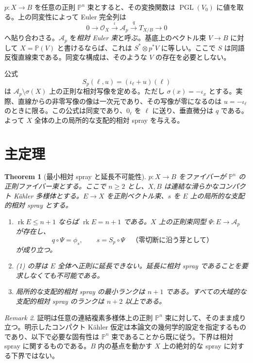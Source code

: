 \documentclass[12pt]{amsart}
\newtheorem{thm}{Theorem}[section]
\theoremstyle{definition}
\theoremstyle{remark}
\newtheorem{rem}[thm]{Remark}
\numberwithin{equation}{section}
\newcommand{\rk}{\operatorname{rk}}
\newcommand{\cA}{\mathcal{A}}
\newcommand{\cO}{\mathcal{O}}
\newcommand{\mP}{\mathbb{P}}
\DeclareMathOperator{\PG}{PGL}
\begin{document}
$p:X\to B$ を任意の正則 $\mP^n$ 束とすると、その変換関数は $\PG(V_0)$ に値を取る。上の同変性によって Euler 完全列は
\begin{equation}\label{ja:relativeeuler}
0\longrightarrow\cO_X\xrightarrow{\iota}\cA_p
\xrightarrow{q}T_{X/B}\longrightarrow0
\end{equation}
へ貼り合わさる。$\cA_p$ を\emph{相対 Euler 束}と呼ぶ。基底上のベクトル束 $V\to B$ に対して $X=\mP(V)$ と書けるならば、これは $S^*\otimes p^*V$ に等しい。ここで $S$ は同語反復直線束である。同変な構成は、そのような $V$ の存在を必要としない。

公式
\begin{equation}\label{ja:canonical}
S_p(\ell,u)=(\iota_\ell+u)(\ell)
\end{equation}
は $\cA_p\setminus\sigma(X)$ 上の正則な相対写像を定める。ただし $\sigma(x)=-\iota_x$ とする。実際、直線からの非零写像の像は一次元であり、その写像が零になるのは $u=-\iota_\ell$ のときに限る。この公式は同変であり、$0_\ell$ を $\ell$ に送り、垂直微分は $q$ である。よって $X$ 全体の上の局所的な支配的相対 spray を与える。

\section{主定理}\label{ja:mainsection}
\begin{thm}[最小相対 spray と延長不可能性]\label{ja:main}
$p:X\to B$ をファイバーが $\mP^n$ の正則ファイバー束とする。ここで $n\geq2$ とし、$X,B$ は連結な滑らかなコンパクト K\"ahler 多様体とする。$E\to X$ を正則ベクトル束、$s$ を $E$ 上の局所的な支配的相対 spray とする。
\begin{enumerate}
\item $\rk E\leq n+1$ ならば $\rk E=n+1$ である。$X$ 上の正則束同型 $\Psi:E\to\cA_p$ が存在し、
\[
q\circ\Psi=\phi_s,\qquad s=S_p\circ\Psi
\quad\text{（零切断に沿う芽として）}
\]
が成り立つ。
\item (1) の芽は $E$ 全体へ正則に延長できない。延長に相対 spray であることを要求しなくても不可能である。
\item 局所的な支配的相対 spray の最小ランクは $n+1$ である。すべての大域的な支配的相対 spray のランクは $n+2$ 以上である。
\end{enumerate}
\end{thm}

\begin{rem}\label{ja:scope}
証明は任意の連結複素多様体上の正則 $\mP^n$ 束に対して、そのまま成り立つ。明示したコンパクト K\"ahler 仮定は本論文の幾何学的設定を指定するものであり、以下で必要な固有性は $\mP^n$ 束であることから既に従う。下界は相対 spray に関するものである。$B$ 内の基点を動かす $X$ 上の絶対的な spray に対する下界ではない。
\end{rem}
\end{document}

